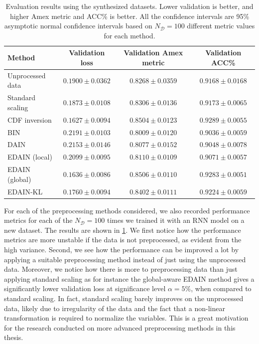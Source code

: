 \documentclass{statsmsc}
\begin{document}
{%
\begin{table}[htp]
    \centering
    \begin{tabular}{l|ccc}
        \toprule
        Method        & Validation loss &     Validation Amex metric &            Validation ACC\% \\
        \midrule
        Unprocessed data           & $0.1900 \pm 0.0362$ & $0.8268 \pm 0.0359$ & $0.9168 \pm 0.0168$  \\
        Standard scaling      & $0.1873 \pm 0.0108$ & $0.8306 \pm 0.0136$ & $0.9173 \pm 0.0065$  \\
        \ac{CDF} inversion  & $\mathbf{ 0.1627 \pm 0.0094}$ & $0.8504 \pm 0.0123$ & $\mathbf{0.9289 \pm 0.0055}$  \\
        BIN           & $0.2191 \pm 0.0103$ & $0.8009 \pm 0.0120$ & $0.9036 \pm 0.0059$  \\
        DAIN          & $0.2153 \pm 0.0146$ & $0.8077 \pm 0.0152$ & $0.9048 \pm 0.0078$  \\
        EDAIN (local)  & $0.2099 \pm 0.0095$ & $0.8110 \pm 0.0109$ & $0.9071 \pm 0.0057$  \\
        EDAIN (global) & $0.1636 \pm 0.0086$ & $\mathbf{0.8506 \pm 0.0110}$ & $0.9283 \pm 0.0051$  \\
        EDAIN-KL      & $0.1760 \pm 0.0094$ & $0.8402 \pm 0.0111$ & $0.9224 \pm 0.0059$  \\
        \bottomrule
    \end{tabular}%
    \caption{
        Evaluation results using the synthesized datasets. Lower validation is better, and
        higher Amex metric and ACC\% is better. All the confidence intervals are 95\% asymptotic
        normal confidence intervals based on $N_{\mathcal{D}}=100$ different metric values for
        each method.
    }%
    \label{tab:synth_results}
\end{table}

For each of the preprocessing methods considered, we also recorded performance metrics for each
of the $N_{\mathcal{D}}=100$ times we trained it with an \ac{RNN} model on a new dataset.
The results are
shown in \cref{tab:synth_results}. We first notice how the performance metrics are more unstable
if the data is not preprocessed, as evident from the high variance. Second, we see how the
performance can be improved a lot by applying a suitable preprocessing method instead of just
using the unprocessed data. Moreover, we notice how there is more to preprocessing data than just
applying standard scaling as for instance the global-aware \ac{EDAIN} method
gives a significantly lower validation loss at significance level $\alpha=5\%$, when
compared to standard scaling. In fact, standard scaling barely improves on the unprocessed data,
likely due to irregularity of the data and the fact that a non-linear transformation is required
to normalize the variables.  This is a great motivation for the research conducted on more advanced
preprocessing methods in this thesis.

}
\end{document}
